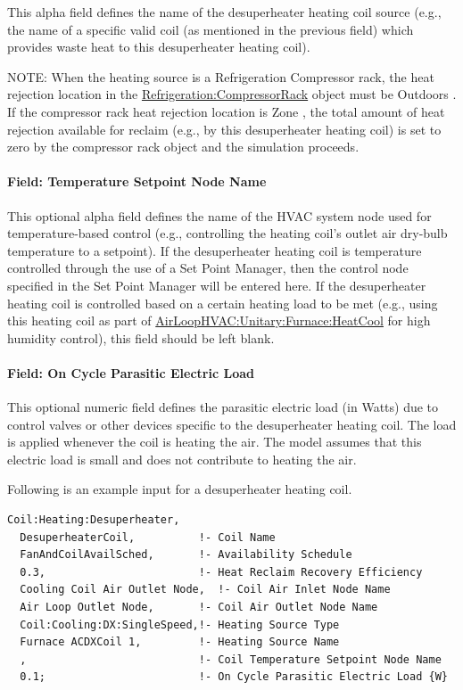 This alpha field defines the name of the desuperheater heating coil source (e.g., the name of a specific valid coil (as mentioned in the previous field) which provides waste heat to this desuperheater heating coil).

NOTE: When the heating source is a Refrigeration Compressor rack, the heat rejection location in the \hyperref[refrigerationcompressorrack]{Refrigeration:CompressorRack} object must be Outdoors . If the compressor rack heat rejection location is Zone , the total amount of heat rejection available for reclaim (e.g., by this desuperheater heating coil) is set to zero by the compressor rack object and the simulation proceeds.

\paragraph{Field: Temperature Setpoint Node Name}\label{field-temperature-setpoint-node-name-3}

This optional alpha field defines the name of the HVAC system node used for temperature-based control (e.g., controlling the heating coil's outlet air dry-bulb temperature to a setpoint). If the desuperheater heating coil is temperature controlled through the use of a Set Point Manager, then the control node specified in the Set Point Manager will be entered here. If the desuperheater heating coil is controlled based on a certain heating load to be met (e.g., using this heating coil as part of \hyperref[airloophvacunitaryfurnaceheatcool]{AirLoopHVAC:Unitary:Furnace:HeatCool} for high humidity control), this field should be left blank.

\paragraph{Field: On Cycle Parasitic Electric Load}\label{field-parasitic-electric-load}

This optional numeric field defines the parasitic electric load (in Watts) due to control valves or other devices specific to the desuperheater heating coil. The load is applied whenever the coil is heating the air. The model assumes that this electric load is small and does not contribute to heating the air.

Following is an example input for a desuperheater heating coil.

\begin{lstlisting}
Coil:Heating:Desuperheater,
  DesuperheaterCoil,          !- Coil Name
  FanAndCoilAvailSched,       !- Availability Schedule
  0.3,                        !- Heat Reclaim Recovery Efficiency
  Cooling Coil Air Outlet Node,  !- Coil Air Inlet Node Name
  Air Loop Outlet Node,       !- Coil Air Outlet Node Name
  Coil:Cooling:DX:SingleSpeed,!- Heating Source Type
  Furnace ACDXCoil 1,         !- Heating Source Name
  ,                           !- Coil Temperature Setpoint Node Name
  0.1;                        !- On Cycle Parasitic Electric Load {W}
\end{lstlisting}

